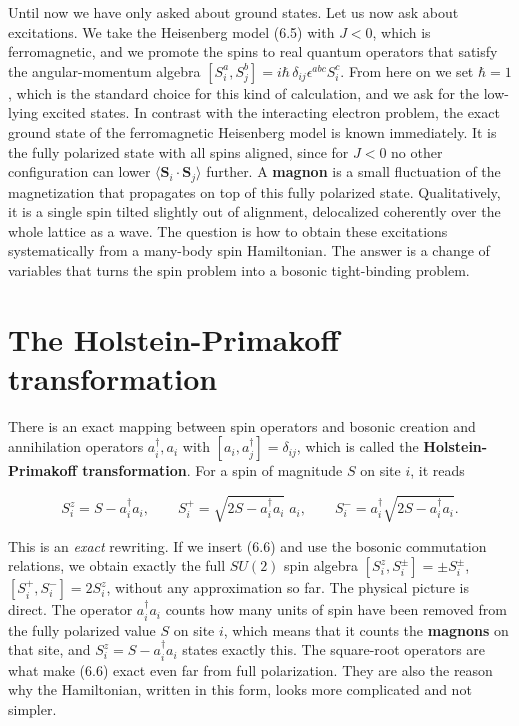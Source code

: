 Until now we have only asked about ground states. Let us now ask about excitations. We take the
Heisenberg model (6.5) with $J<0$, which is ferromagnetic, and we promote the spins to real quantum
operators that satisfy the angular-momentum algebra $[S_i^a,S_j^b] = i\hbar\,\delta_{ij}\epsilon^{abc}S_i^c$.
From here on we set $\hbar=1$, which is the standard choice for this kind of calculation, and we ask
for the low-lying excited states. In contrast with the interacting electron problem, the exact ground
state of the ferromagnetic Heisenberg model is known immediately. It is the fully polarized state with
all spins aligned, since for $J<0$ no other configuration can lower $\langle \mathbf S_i\cdot\mathbf
S_j\rangle$ further. A \textbf{magnon} is a small fluctuation of the magnetization that propagates on
top of this fully polarized state. Qualitatively, it is a single spin tilted slightly out of
alignment, delocalized coherently over the whole lattice as a wave. The question is how to obtain
these excitations systematically from a many-body spin Hamiltonian. The answer is a change of
variables that turns the spin problem into a bosonic tight-binding problem.

\section{The Holstein-Primakoff transformation}

There is an exact mapping between spin operators and bosonic creation and annihilation operators
$a_i^\dagger, a_i$ with $[a_i,a_j^\dagger]=\delta_{ij}$, which is called the \textbf{Holstein-Primakoff
transformation}. For a spin of magnitude $S$ on site $i$, it reads

\begin{equation}
S_i^z = S - a_i^\dagger a_i, \qquad S_i^+ = \sqrt{2S-a_i^\dagger a_i}\;a_i, \qquad S_i^- = a_i^\dagger\sqrt{2S-a_i^\dagger a_i}.
\end{equation}

This is an \emph{exact} rewriting. If we insert (6.6) and use the bosonic commutation relations, we
obtain exactly the full $SU(2)$ spin algebra $[S_i^z,S_i^\pm]=\pm S_i^\pm$, $[S_i^+,S_i^-]=2S_i^z$,
without any approximation so far. The physical picture is direct. The operator $a_i^\dagger a_i$ counts
how many units of spin have been removed from the fully polarized value $S$ on site $i$, which means
that it counts the \textbf{magnons} on that site, and $S_i^z=S-a_i^\dagger a_i$ states exactly this.
The square-root operators are what make (6.6) exact even far from full polarization. They are also the
reason why the Hamiltonian, written in this form, looks more complicated and not simpler.

